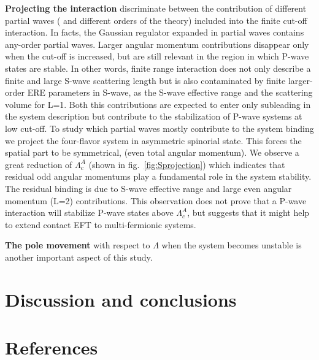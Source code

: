 \documentclass[preprint,12pt]{elsarticle}
\newcommand{\figref}[1]{fig.~\ref{#1}}
\begin{document}
\textbf{Projecting the interaction} discriminate between the contribution of different partial waves ( and different orders of the theory) included into the finite cut-off interaction.
In facts, the Gaussian regulator expanded in partial waves contains any-order partial waves.
Larger angular momentum contributions disappear only when the cut-off is increased, but are still relevant in the region in which P-wave states are stable. 
In other words, finite range interaction does not only describe a finite and large S-wave scattering length but is also contaminated by finite larger-order ERE parameters in S-wave, as the S-wave effective range and the scattering volume for L=1.
Both this contributions are expected to enter only subleading in the system description but contribute to the stabilization of P-wave systems at low cut-off.
To study which partial waves mostly contribute to the system binding we project the four-flavor system in asymmetric spinorial state.
This forces the spatial part to be symmetrical, (even total angular momentum). 
We observe a great reduction of $\Lambda_c^A$ (shown in \figref{fig:Sprojection}) which indicates that residual odd angular momentums play a fundamental role in the system stability.
The residual binding is due to S-wave effective range and large even angular momentum (L=2) contributions.
This observation does not prove that a P-wave interaction will stabilize P-wave states above $\Lambda_c^A$, but suggests that it might help to extend contact EFT to multi-fermionic systems.

\textbf{The pole movement} with respect to $\Lambda$ when the system becomes unstable is another important aspect of this study.



\section{Discussion and conclusions}

\newpage
\section*{References}


\end{document}

